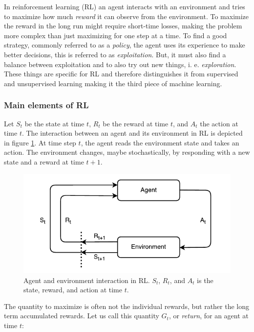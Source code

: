 In reinforcement learning (RL) an agent interacts with an environment and tries
to maximize how much \textit{reward} it can observe from the environment. To
maximize the reward in the long run might require short-time losses, making the
problem more complex than just maximizing for one step at a time. To find a
good strategy, commonly referred to as a \textit{policy}, the agent uses its
experience to make better decisions, this is referred to as
\textit{exploitation}. But, it must also find a balance between exploitation
and to also try out new things, i. e. \textit{exploration}. These things are
specific for RL and therefore distinguishes it from supervised and unsupervised
learning making it the third piece of machine learning.

\subsubsection{Main elements of RL}

Let $S_t$ be the state at time $t$, $R_t$ be the reward at time $t$, and $A_t$
the action at time $t$. The interaction between an agent and its environment in
RL is depicted in figure \ref{fig:rl_flowchart}. At time step $t$, the agent reads
the environment state and takes an action. The environment changes, maybe
stochastically, by responding with a new state and a reward at time $t+1$. 

\begin{figure}[h]
    \centering
    \includegraphics[]{res/agent_environment_interaction.pdf}

    \caption{Agent and environment interaction in RL. $S_t$, $R_t$, and $A_t$
             is the state, reward, and action at time $t$.}

    \label{fig:rl_flowchart}
\end{figure}

The quantity to maximize is often not the individual rewards, but rather the
long term accumulated rewards. Let us call this quantity $G_t$, or
\textit{return}, for an agent at time $t$:

